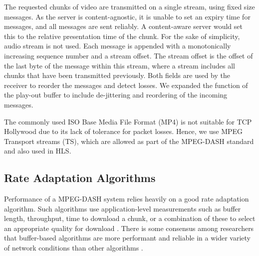 The requested chunks of video are transmitted on a single stream, using fixed size
messages. As the server is content-agnostic, it is unable to set an expiry time for messages, and
all messages are sent reliably. A content-aware server would set this to the relative presentation time of the chunk.
For the sake of simplicity, audio
stream is not used. Each message is appended with a monotonically increasing sequence
number and a stream offset. The stream offset is the offset of the last byte of the
message within this stream, where a stream includes all chunks that have been transmitted
previously. Both fields are used by the receiver to reorder the messages and detect
losses. We expanded the function of the play-out buffer to include de-jittering and
reordering of the incoming messages.

The commonly used ISO Base Media File Format (MP4) is not suitable for TCP Hollywood due to its lack of tolerance for packet losses. Hence, we use MPEG Transport streams (TS), which are allowed as part of the MPEG-DASH standard and also used in HLS.

\subsection{Rate Adaptation Algorithms}

Performance of a MPEG-DASH system relies heavily on a good rate adaptation algorithm.
Such algorithms use application-level measurements such as buffer length, throughput, time to
download a chunk, or a combination of these to select an appropriate quality for
download \cite{beben2016abma+, spiteri2016bola, li2014probe}. There is some consensus
among researchers that buffer-based algorithms are more performant and reliable in a wider
variety of network conditions than other algorithms 
\cite{huang2015buffer, karagkioules2017comparative}.

